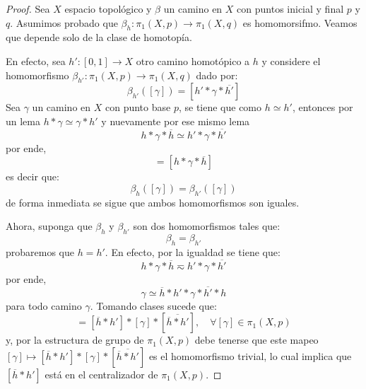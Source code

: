 \documentclass[12pt]{report}
\theoremstyle{largebreak}
\newcommand\cf[3]{\ensuremath{#1:#2\rightarrow#3}}
\begin{document}
    \begin{proof}
        Sea $X$ espacio topológico y $\beta$ un camino en $X$ con puntos inicial y final $p$ y $q$. Asumimos probado que $\cf{\beta_h}{\pi_1(X,p)}{\pi_1(X,q)}$ es homomorsifmo. Veamos que depende solo de la clase de homotopía.
        
        En efecto, sea $\cf{h'}{[0,1]}{X}$ otro camino homotópico a $h$ y considere el homomorfismo $\cf{\beta_{ h'}}{\pi_1(X,p)}{\pi_1(X,q)}$ dado por:
        \begin{equation*}
            \beta_{h'}([\gamma])=[h'*\gamma*\overline{h'}]
        \end{equation*}
        Sea $\gamma$ un camino en $X$ con punto base $p$, se tiene que como $h\simeq h'$, entonces por un lema $h*\gamma\simeq\gamma*h'$ y nuevamente por ese mismo lema
        \begin{equation*}
            h*\gamma*\overline{h}\simeq h'*\gamma*\overline{h'}
        \end{equation*}
        por ende,
        \begin{equation*}
            [h*\gamma*\overline{h}]=[h*\gamma*\overline{h}]
        \end{equation*}
        es decir que:
        \begin{equation*}
            \beta_{h}([\gamma])=\beta_{h'}([\gamma])
        \end{equation*}
        de forma inmediata se sigue que ambos homomorfismos son iguales.

        Ahora, suponga que $\beta_h$ y $\beta_{h'}$ son dos homomorfismos tales que:
        \begin{equation*}
            \beta_h=\beta_{h'}
        \end{equation*}
        probaremos que $h=h'$. En efecto, por la igualdad se tiene que:
        \begin{equation*}
            h*\gamma*\overline{h}\eqsim h'*\gamma*\overline{h'}
        \end{equation*}
        por ende,
        \begin{equation*}
            \gamma\simeq\overline{h}*h'*\gamma*\overline{h'}*h
        \end{equation*}
        para todo camino $\gamma$. Tomando clases sucede que:
        \begin{equation*}
            [\gamma]=[\overline{h}*h']*[\gamma]*[\overline{\overline{h}*h'}],\quad\forall [\gamma]\in\pi_1(X,p)
        \end{equation*}
        y, por la estructura de grupo de $\pi_1(X,p)$ debe tenerse que este mapeo $[\gamma]\mapsto[\overline{h}*h']*[\gamma]*[\overline{\overline{h}*h'}]$ es el homomorfismo trivial, lo cual implica que $[\overline{h}*h']$ está en el centralizador de $\pi_1(X,p)$.
    \end{proof}
    
\end{document}
